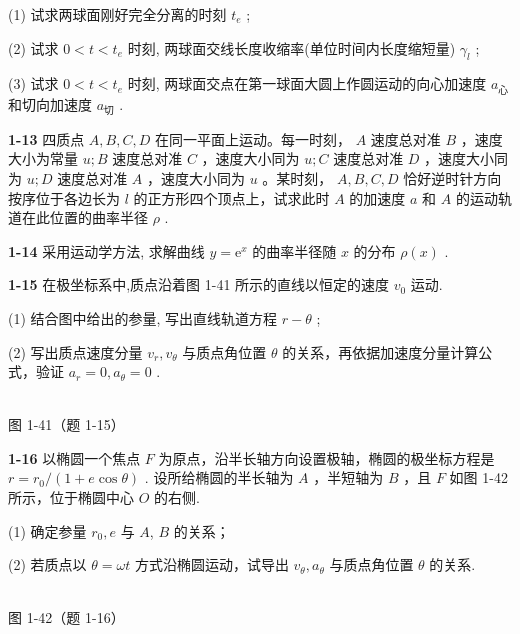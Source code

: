 (1) 试求两球面刚好完全分离的时刻 $t_{e}$ ;

(2) 试求 $0 < t < t_{e}$ 时刻, 两球面交线长度收缩率(单位时间内长度缩短量) $\gamma_l$ ;

(3) 试求 $0 < t < t_{e}$ 时刻, 两球面交点在第一球面大圆上作圆运动的向心加速度 $a_{\text{心}}$ 和切向加速度 $a_{\text{切}}$ .

\newpage

\textbf{1-13} 四质点 $A, B, C, D$ 在同一平面上运动。每一时刻， $A$ 速度总对准 $B$ ，速度大小为常量 $u; B$ 速度总对准 $C$ ，速度大小同为 $u; C$ 速度总对准 $D$ ，速度大小同为 $u; D$ 速度总对准 $A$ ，速度大小同为 $u$ 。某时刻， $A, B, C, D$ 恰好逆时针方向按序位于各边长为 $l$ 的正方形四个顶点上，试求此时 $A$ 的加速度 $a$ 和 $A$ 的运动轨道在此位置的曲率半径 $\rho$ .

\newpage

\textbf{1-14} 采用运动学方法, 求解曲线 $y = \mathrm{e}^x$ 的曲率半径随 $x$ 的分布 $\rho(x)$ .

\newpage

\textbf{1-15} 在极坐标系中,质点沿着图 1-41 所示的直线以恒定的速度 $v_{0}$ 运动.

(1) 结合图中给出的参量, 写出直线轨道方程 $r-\theta$ ;

(2) 写出质点速度分量 $v_{r}, v_{\theta}$ 与质点角位置 $\theta$ 的关系，再依据加速度分量计算公式，验证 $a_{r}=0, a_{\theta}=0$ .

\begin{center}
\resizebox{0.34\textwidth}{!}{}\\[4pt]
{\small 图 1-41（题 1-15）}
\end{center}

\newpage

\textbf{1-16} 以椭圆一个焦点 $F$ 为原点，沿半长轴方向设置极轴，椭圆的极坐标方程是 $r = r_0 / (1 + e\cos \theta)$ . 设所给椭圆的半长轴为 $A$ ，半短轴为 $B$ ，且 $F$ 如图 1-42 所示，位于椭圆中心 $O$ 的右侧.

(1) 确定参量 $r_{0}, e$ 与 $A$, $B$ 的关系；

(2) 若质点以 $\theta=\omega t$ 方式沿椭圆运动，试导出 $v_{\theta}, a_{\theta}$ 与质点角位置 $\theta$ 的关系.

\begin{center}
\resizebox{0.44\textwidth}{!}{}\\[4pt]
{\small 图 1-42（题 1-16）}
\end{center}

